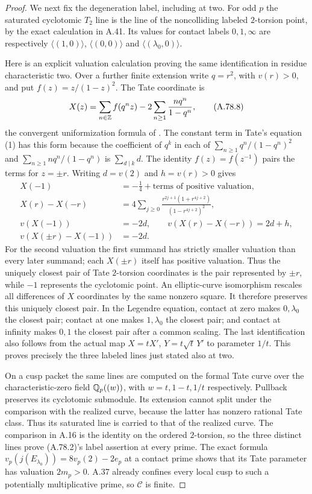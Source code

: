 \begin{proof}
We next fix the degeneration label, including at two.
For odd $p$ the saturated cyclotomic $T_2$ line is the line
of the noncolliding labeled $2$-torsion point, by the exact
calculation in A.41.  Its values for contact labels
$0,1,\infty$ are respectively
$\langle(1,0)\rangle$, $\langle(0,0)\rangle$ and
$\langle(\lambda_0,0)\rangle$.

Here is an explicit valuation calculation proving the same
identification in residue characteristic two.  Over a further
finite extension write $q=r^2$, with $v(r)>0$, and put
$f(z)=z/(1-z)^2$.  The Tate coordinate is
\[
 X(z)=\sum_{n\in\mathbb Z}f(q^nz)
                      -2\sum_{n\ge1}\frac{nq^n}{1-q^n},
\tag{A.78.8}
\]
the convergent uniformization formula of
\cite[equations (1)--(4) and Theorem 1]{LegTate1995}.
The constant term in Tate's equation (1) has this form
because the coefficient of $q^k$ in each of
$\sum_{n\ge1}q^n/(1-q^n)^2$ and
$\sum_{n\ge1}nq^n/(1-q^n)$ is $\sum_{d\mid k}d$.
The identity $f(z)=f(z^{-1})$ pairs the terms for $z=\pm r$.
Writing $d=v(2)$ and $h=v(r)>0$ gives
\[
 \begin{split}
 X(-1)&=-\tfrac14+\text{terms of positive valuation},\\
 X(r)-X(-r)
   &=4\sum_{j\ge0}
       \frac{r^{2j+1}(1+r^{4j+2})}{(1-r^{4j+2})^2},\\
 v(X(-1))&=-2d,\qquad
 v(X(r)-X(-r))=2d+h,\\
 v(X(\pm r)-X(-1))&=-2d.
 \end{split}
\tag{A.78.9}
\]
For the second valuation the first summand has strictly smaller
valuation than every later summand; each $X(\pm r)$ itself
has positive valuation.  Thus the uniquely closest pair of
Tate $2$-torsion coordinates is the pair represented by
$\pm r$, while $-1$ represents the cyclotomic point.
An elliptic-curve isomorphism rescales all differences of
$X$ coordinates by the same nonzero square.  It therefore
preserves this uniquely closest pair.
In the Legendre equation, contact at zero makes
$0,\lambda_0$ the closest pair; contact at one makes
$1,\lambda_0$ the closest pair; and contact at infinity
makes $0,1$ the closest pair after a common scaling.
The last identification also follows from the actual map
$X=tX'$, $Y=t\sqrt t\,Y'$ to parameter $1/t$.
This proves precisely the three labeled lines just stated
also at two.

On a cusp packet the same lines are computed on the formal
Tate curve over the characteristic-zero field $\mathbb Q_p((w))$,
with $w=t,1-t,1/t$ respectively.  Pullback preserves its
cyclotomic submodule.  Its extension cannot split under the
comparison with the realized curve, because the latter has
nonzero rational Tate class.  Thus its saturated line is
carried to that of the realized curve.  The comparison in
A.16 is the identity on the ordered $2$-torsion, so the three
distinct lines prove (A.78.2)'s label assertion at every prime.
The exact formula
$v_p(j(E_{\lambda_0}))=8v_p(2)-2e_p$
at a contact prime shows that its Tate parameter has valuation
$2m_p>0$.  A.37 already confines every local cusp to such a
potentially multiplicative prime, so $\mathcal C$ is finite.


\end{proof}
